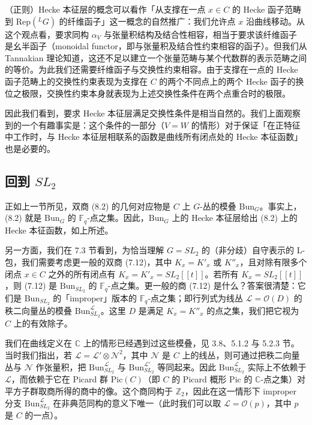 \documentclass[11pt,a4paper]{article}
\newcommand{\Bun}{\mathrm{Bun}}
\begin{document}
（正则）Hecke 本征层的概念可以看作「从支撑在一点 $x\in C$ 的 Hecke 函子范畴到 $\mathrm{Rep}({}^{L}G)$ 的纤维函子」这一概念的自然推广：我们允许点 $x$ 沿曲线移动。从这个观点看，要求同构 $\alpha_V$ 与张量积结构及结合性相容，相当于要求该纤维函子
是幺半函子（monoidal functor，即与张量积及结合性约束相容的函子）。但我们从 Tannakian 理论知道，这还不足以建立一个张量范畴与某个代数群的表示范畴之间的等价。为此我们还需要纤维函子与交换性约束相容。由于支撑在一点的 Hecke 函子范畴上的交换性约束表现为支撑在 $C$ 的两个不同点上的两个 Hecke 函子的换位之极限，交换性约束本身就表现为上述交换性条件在两个点重合时的极限。

因此我们看到，要求 Hecke 本征层满足交换性条件是相当自然的。我们上面观察到的一个有趣事实是：这个条件的一部分（$V = W$ 的情形）对于保证「在正特征中工作时，与 Hecke 本征层相联系的函数是曲线所有闭点处的 Hecke 本征函数」也是必要的。

\subsection{回到 \texorpdfstring{$SL_2$}{SL2}}

正如上一节所见，双商 (8.2) 的几何对应物是 $C$ 上 $G$-丛的模叠 $\Bun_G$。事实上，(8.2) 就是 $\Bun_G$ 的 $\mathbb{F}_q$-点之集。因此，$\Bun_G$ 上的 Hecke 本征层给出 (8.2) 上的 Hecke 本征函数，如上所述。

另一方面，我们在 7.3 节看到，为恰当理解 $G = SL_2$ 的（非分歧）自守表示的 L-包，我们需要考虑更一般的双商 (7.12)，其中 $K_x = K'_x$ 或 $K''_x$，且对除有限多个闭点 $x\in C$ 之外的所有闭点有 $K_x = K'_x = SL_2[[t]]$。若所有 $K_x = SL_2[[t]]$，则 (7.12) 是 $\Bun_{SL_2}$ 的 $\mathbb{F}_q$-点之集。更一般的商 (7.12) 是什么？答案很清楚：它们是 $\Bun_{SL_2}$ 的「improper」版本的 $\mathbb{F}_q$-点之集；即行列式为线丛 $\mathcal{L} = \mathcal{O}(D)$ 的秩二向量丛的模叠 $\Bun^{\mathcal{L}}_{SL_2}$。这里 $D$ 是满足 $K_x = K''_x$ 的点之集，我们把它视为 $C$ 上的有效除子。

我们在曲线定义在 $\mathbb{C}$ 上的情形已经遇到过这些模叠，见 3.8、5.1.2 与 5.2.3 节。当时我们指出，若 $\mathcal{L} = \mathcal{L}'\otimes \mathcal{N}^2$，其中 $\mathcal{N}$ 是 $C$ 上的线丛，则可通过把秩二向量丛与 $\mathcal{N}$ 作张量积，把 $\Bun^{\mathcal{L}}_{SL_2}$ 与 $\Bun^{\mathcal{L}'}_{SL_2}$ 等同起来。因此 $\Bun^{\mathcal{L}}_{SL_2}$ 实际上不依赖于 $\mathcal{L}$，而依赖于它在 Picard 群 $\mathrm{Pic}(C)$（即 $C$ 的 Picard 概形 $\mathrm{Pic}$ 的 $\mathbb{C}$-点之集）对平方子群取商所得的商中的像。这个商同构于 $\mathbb{Z}_2$，因此在这一情形下 improper 分支 $\Bun^{\mathcal{L}}_{SL_2}$ 在非典范同构的意义下唯一（此时我们可以取 $\mathcal{L} = \mathcal{O}(p)$，其中 $p$ 是 $C$ 的一点）。
\end{document}
